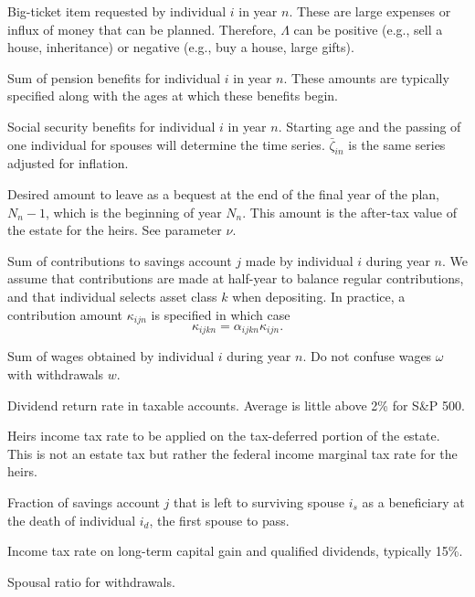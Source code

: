 \documentclass{article}[fleqn,12pt]
\begin{document}
\begin{description}[leftmargin=4em,style=multiline]
\item [$\Lambda_{in}$]
	Big-ticket item requested by individual $i$ in year $n$.
	These are large expenses or influx of money
	that can be planned. Therefore, $\Lambda$ can be positive (e.g., sell a house, inheritance)
	or negative (e.g., buy a house, large gifts).
\item [$\pi_{in}$]
	Sum of pension benefits for individual $i$ in year $n$. These amounts are typically
	specified along with the ages at which these benefits begin.
\item [$\zeta_{in}$]
	Social security benefits for individual $i$ in year $n$. Starting age and the passing
	of one individual for spouses will determine the time series. $\bar{\zeta}_{in}$ is
	the same series adjusted for inflation.
\item [$\epsilon_{N_n}$]
	Desired amount to leave as a bequest at the end of the final year of the plan, $N_n-1$,
	which is the beginning of year $N_n$. This amount is the after-tax value of the estate
	for the heirs. See parameter $\nu$.
\item [$\kappa_{ijkn}$]
	Sum of contributions to savings account $j$ made by individual $i$ during year $n$.
	We assume that contributions are made at half-year to balance regular contributions,
	and that individual selects asset class $k$ when depositing. In practice, a contribution
	amount $\kappa_{ijn}$ is specified in which case 
	\begin{equation}
		\kappa_{ijkn} = \alpha_{ijkn}\kappa_{ijn}.
	\end{equation}
\item [$\omega_{in}$]
	Sum of wages obtained by individual $i$ during year $n$.
	Do not confuse wages $\omega$ with withdrawals $w$.
\item [$\mu$]
	Dividend return rate in taxable accounts. Average is little above 2\% for S\&P 500.
\item [$\nu$]
	Heirs income tax rate to be applied on the tax-deferred portion of the estate. This is not an estate tax
	but rather the federal income marginal tax rate for the heirs.
\item [$\phi_j$]
	Fraction of savings account $j$ that is left to surviving spouse $i_s$ as a beneficiary
	at the death of individual $i_d$, the first spouse to pass.
\item [$\psi$]
	Income tax rate on long-term capital gain and qualified dividends, typically 15\%.
\item [$\eta$]
	Spousal ratio for withdrawals.
\end{description}
\end{document}
